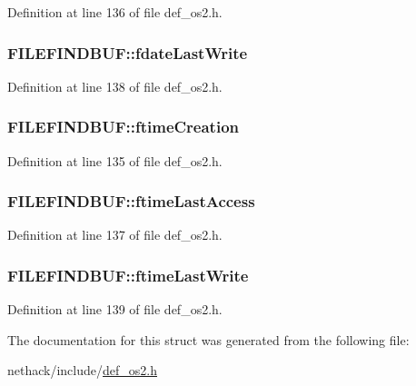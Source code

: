Definition at line 136 of file def\+\_\+os2.\+h.

\hypertarget{structFILEFINDBUF_a27e4b54315abe4fe197cb0787967731c}{
\subsubsection[{fdate\+Last\+Write}]{ F\+I\+L\+E\+F\+I\+N\+D\+B\+U\+F\+::fdate\+Last\+Write}}\label{structFILEFINDBUF_a27e4b54315abe4fe197cb0787967731c}


Definition at line 138 of file def\+\_\+os2.\+h.

\hypertarget{structFILEFINDBUF_a002765f96ab99ffba6f4dfb0eebba6d8}{
\subsubsection[{ftime\+Creation}]{ F\+I\+L\+E\+F\+I\+N\+D\+B\+U\+F\+::ftime\+Creation}}\label{structFILEFINDBUF_a002765f96ab99ffba6f4dfb0eebba6d8}


Definition at line 135 of file def\+\_\+os2.\+h.

\hypertarget{structFILEFINDBUF_ad8c8318225106300774d3d535f66b47d}{
\subsubsection[{ftime\+Last\+Access}]{ F\+I\+L\+E\+F\+I\+N\+D\+B\+U\+F\+::ftime\+Last\+Access}}\label{structFILEFINDBUF_ad8c8318225106300774d3d535f66b47d}


Definition at line 137 of file def\+\_\+os2.\+h.

\hypertarget{structFILEFINDBUF_a2bbbbf1d944946968d68dd47833c3d96}{
\subsubsection[{ftime\+Last\+Write}]{ F\+I\+L\+E\+F\+I\+N\+D\+B\+U\+F\+::ftime\+Last\+Write}}\label{structFILEFINDBUF_a2bbbbf1d944946968d68dd47833c3d96}


Definition at line 139 of file def\+\_\+os2.\+h.



The documentation for this struct was generated from the following file\+:\begin{DoxyCompactItemize}
\item 
nethack/include/\hyperlink{def__os2_8h}{def\+\_\+os2.\+h}\end{DoxyCompactItemize}

